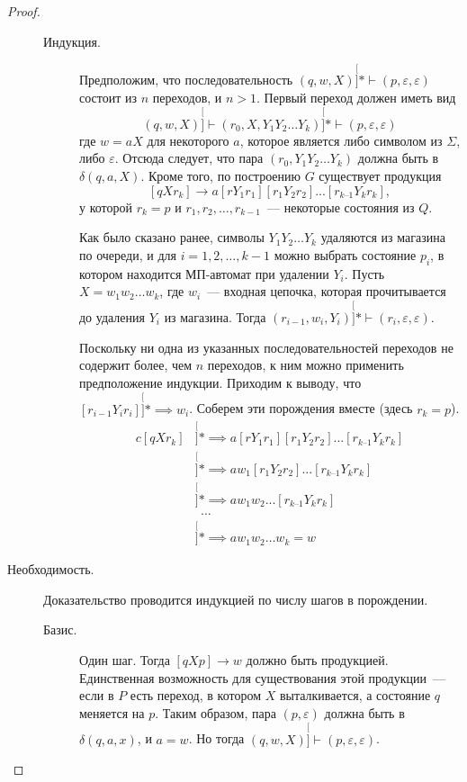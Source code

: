 \documentclass[a4paper,12pt]{article}
\begin{document}
\begin{proof}
\begin{description}
\begin{description}
			\item[Индукция.] Предположим, что последовательность \((q, w, X) \stackrel[]{*}{\vdash} (p, \varepsilon, \varepsilon)\) состоит из \(n\) переходов, и \(n > 1\). Первый переход должен иметь вид
			\[(q, w, X) \stackrel[]{}{\vdash} (r_0, X, Y_1 Y_2 \ldots Y_k) \stackrel[]{*}{\vdash} (p, \varepsilon, \varepsilon)\]
			где \(w = aX\) для некоторого \(a\), которое является либо символом из \(\Sigma\), либо \(\varepsilon\). Отсюда следует, что пара \((r_0, Y_1 Y_2 \ldots Y_k)\) должна быть в \(\delta(q, a, X)\). Кроме того, по построению \(G\) существует продукция \[[q X r_k] \to a[r Y_1 r_1][r_1 Y_2 r_2]...[r_{k–1} Y_k r_k],\] у которой \(r_k = p\) и \(r_1, r_2, \ldots, r_{k - 1}\)~--- некоторые состояния из \(Q\).
			
			Как было сказано ранее, символы \(Y_1 Y_2 \ldots Y_k\) удаляются из магазина по очереди, и для \(i = 1, 2, \ldots, k - 1\) можно выбрать состояние \(p_i\), в котором находится МП-автомат при удалении \(Y_i\). Пусть \(X = w_1 w_2 \ldots w_k\), где \(w_i\)~--- входная цепочка, которая прочитывается до удаления \(Y_i\) из магазина. Тогда \((r_{i - 1}, w_{i}, Y_{i}) \stackrel[]{*}{\vdash} (r_i, \varepsilon, \varepsilon)\). 
			
			Поскольку ни одна из указанных последовательностей переходов не содержит более, чем \(n\) переходов, к ним можно применить предположение индукции. Приходим к выводу, что \([r_{i - 1} Y_i r_{i}] \stackrel[]{*}{\implies} w_i\). Соберем эти порождения вместе (здесь \(r_k = p\)).
			\[\begin{aligned}{c}
				[q X r_k] &{} \stackrel[]{*}{\implies}  a[r Y_1 r_1][r_1 Y_2 r_2]...[r_{k–1} Y_k r_k] \\
				&{} \stackrel[]{*}{\implies}  a w_1 [r_1 Y_2 r_2]...[r_{k–1} Y_k r_k] \\
				&{} \stackrel[]{*}{\implies}  a w_1 w_2 ...[r_{k–1} Y_k r_k] \\
				&{}\ \ \dots \\
				&{} \stackrel[]{*}{\implies}  a w_1 w_2 \ldots w_k = w 
			\end{aligned}\]
		\end{description}
		
		\item[Необходимость.] Доказательство проводится индукцией по числу шагов в порождении.
		\begin{description}
			\item[Базис.] Один шаг. Тогда \([qXp] \to w\) должно быть продукцией. Единственная возможность для существования этой продукции~--- если в \(P\) есть переход, в котором \(X\) выталкивается, а состояние \(q\) меняется на \(p\). Таким образом, пара \((p, \varepsilon)\) должна быть в \(\delta(q, a, x)\), и \(a = w\). Но тогда \((q, w, X) \stackrel[]{}{\vdash} (p, \varepsilon, \varepsilon)\).
			

\end{description}
\end{description}
\end{proof}
\end{document}
